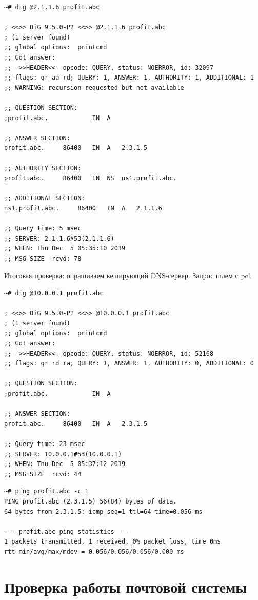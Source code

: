\documentclass[a4paper,12pt]{article}
\begin{document}
\begin{verbatim}
~# dig @2.1.1.6 profit.abc

; <<>> DiG 9.5.0-P2 <<>> @2.1.1.6 profit.abc
; (1 server found)
;; global options:  printcmd
;; Got answer:
;; ->>HEADER<<- opcode: QUERY, status: NOERROR, id: 32097
;; flags: qr aa rd; QUERY: 1, ANSWER: 1, AUTHORITY: 1, ADDITIONAL: 1
;; WARNING: recursion requested but not available

;; QUESTION SECTION:
;profit.abc.			IN	A

;; ANSWER SECTION:
profit.abc.		86400	IN	A	2.3.1.5

;; AUTHORITY SECTION:
profit.abc.		86400	IN	NS	ns1.profit.abc.

;; ADDITIONAL SECTION:
ns1.profit.abc.		86400	IN	A	2.1.1.6

;; Query time: 5 msec
;; SERVER: 2.1.1.6#53(2.1.1.6)
;; WHEN: Thu Dec  5 05:35:10 2019
;; MSG SIZE  rcvd: 78
\end{verbatim}

Итоговая проверка: опрашиваем кеширующий DNS-сервер.
Запрос шлем с pc1

\begin{verbatim}
~# dig @10.0.0.1 profit.abc

; <<>> DiG 9.5.0-P2 <<>> @10.0.0.1 profit.abc
; (1 server found)
;; global options:  printcmd
;; Got answer:
;; ->>HEADER<<- opcode: QUERY, status: NOERROR, id: 52168
;; flags: qr rd ra; QUERY: 1, ANSWER: 1, AUTHORITY: 0, ADDITIONAL: 0

;; QUESTION SECTION:
;profit.abc.			IN	A

;; ANSWER SECTION:
profit.abc.		86400	IN	A	2.3.1.5

;; Query time: 23 msec
;; SERVER: 10.0.0.1#53(10.0.0.1)
;; WHEN: Thu Dec  5 05:37:12 2019
;; MSG SIZE  rcvd: 44
\end{verbatim}

\begin{verbatim}
~# ping profit.abc -c 1
PING profit.abc (2.3.1.5) 56(84) bytes of data.
64 bytes from 2.3.1.5: icmp_seq=1 ttl=64 time=0.056 ms

--- profit.abc ping statistics ---
1 packets transmitted, 1 received, 0% packet loss, time 0ms
rtt min/avg/max/mdev = 0.056/0.056/0.056/0.000 ms
\end{verbatim}

\section{Проверка работы почтовой системы}
\end{document}

